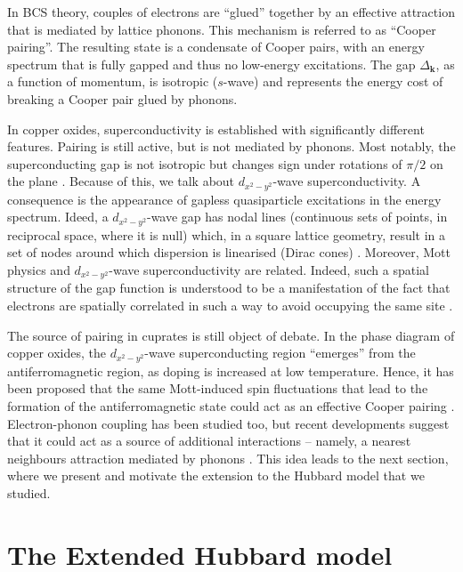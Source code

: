 In BCS theory, couples of electrons are ``glued'' together by an effective attraction that is mediated by lattice phonons. This mechanism is referred to as ``Cooper pairing''. The resulting state is a condensate of Cooper pairs, with an energy spectrum that is fully gapped and thus no low-energy excitations. The gap $\Delta_\mathbf{k}$, as a function of momentum, is isotropic ($s$-wave) and represents the energy cost of breaking a Cooper pair glued by phonons.

In copper oxides, superconductivity is established with significantly different features. Pairing is still active, but is not mediated by phonons. Most notably, the superconducting gap is not isotropic but changes sign under rotations of $\pi/2$ on the plane \cite{scalapino2012common}. Because of this, we talk about $d_{x^2-y^2}$-wave superconductivity. A consequence is the appearance of gapless quasiparticle excitations in the energy spectrum. Ideed, a $d_{x^2-y^2}$-wave gap has nodal lines (continuous sets of points, in reciprocal space, where it is null) which, in a square lattice geometry, result in a set of nodes around which dispersion is linearised (Dirac cones) \cite{coleman2015introduction}. Moreover, Mott physics and $d_{x^2-y^2}$-wave superconductivity are related. Indeed, such a spatial structure of the gap function is understood to be a manifestation of the fact that electrons are spatially correlated in such a way to avoid occupying the same site \cite{scalapino2012common}.

The source of pairing in cuprates is still object of debate. In the phase diagram of copper oxides, the $d_{x^2-y^2}$-wave superconducting region ``emerges'' from the antiferromagnetic region, as doping is increased at low temperature. Hence, it has been proposed that the same Mott-induced spin fluctuations that lead to the formation of the antiferromagnetic state could act as an effective Cooper pairing \cite{coleman2015introduction} \cite{monod1986possible,miyake1986spin,scalapino1986d-wave}. Electron-phonon coupling has been studied too, but recent developments suggest that it could act as a source of additional interactions -- namely, a nearest neighbours attraction mediated by phonons \cite{jiang2022enhancing}. This idea leads to the next section, where we present and motivate the extension to the Hubbard model that we studied.

\section{The Extended Hubbard model}\label{subsec:ehm}

